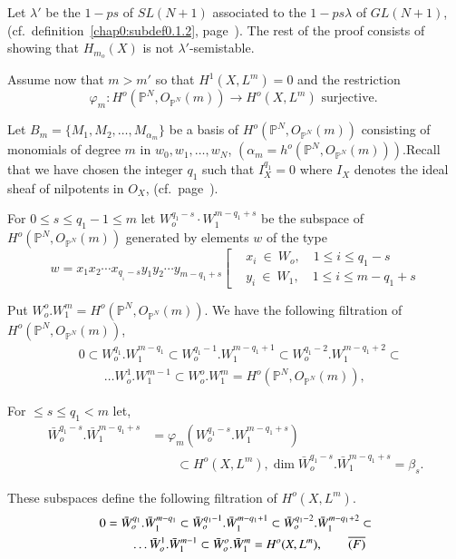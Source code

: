 \noindent
Let $\lambda'$ be the $1-ps$ of $SL(N+1)$ associated to the $1-ps
\lambda$ of $GL(N+1)$, (cf.\ definition~\ref{chap0:subdef0.1.2}, 
page~\pageref{chap0:subdef0.1.2}). The 
rest of the proof consists of showing that $H_{m_o}(X)$ is not
$\lambda'$-semistable. 

Assume now that $m > m'$ so that $H^1 (X, L^m)=0$ and the restriction 
$$
\varphi_m : H^o ( \mathbb{P}^N, O_{\mathbb{P}^N}(m)) \to H^o (X,
L^m) \text{ surjective. } 
$$

\noindent
Let $B_m = \{M_1, M_2, \ldots, M_{\alpha_m}\}$ be a basis of $H^o
(\mathbb{P}^N, O_{\mathbb{P}^N}(m))$ consisting of monomials of
degree $m$ in $w_0, w_1, \ldots , w_N$, $(\alpha_m = h^o (
\mathbb{P}^N, O_{\mathbb{P}^N}(m)))$.\pageoriginale Recall that we have chosen
the integer $q_1$ such that $I^{q_1}_X=0$ where $I_X$ denotes the
ideal sheaf of nilpotents in $O_X$, 
(cf.\ page~\pageref{c1:nilpotents}). 

For $0 \le s \le q_1 - 1 \le m$ let $W_o^{q_1-s} \cdot W_1^{m-q_1+s}$ be
the subspace of $H^o (\mathbb{P}^N, O_{\mathbb{P}^N}(m))$
generated by elements $w$ of the type 
$$
w = x_1 x_2 \cdots x_{q_{_1} -s} y_1 y_2  \cdots y_{m-q_1+s} 
\left[\begin{aligned} & x_i ~\in ~W_o, \quad 1 \le i \le q_1-s\\  
& y_i~ \in~ W_1, \quad 1 \le i \le m-q_1 +s \end{aligned} \right.
$$

Put $W^o_o . W^m_1 = H^o( \mathbb{P}^N, O_{\mathbb{P}^N}(m))$. We
have the following filtration  of $H^o ( \mathbb{P}^N, O_{\mathbb{P}^N}(m))$,  
\begin{align*}
& 0 \subset W_o^{q_1}. W_1^{m-q_1} \subset W_o^{q_1-1}. W^{m-q_1+1}_1
\subset
W^{q_1-2}_o . W^{m-q_1+2}_1 \subset \\
& \qquad \ldots W^1_o . W^{m-1}_1 \subset
W^o_o . W^m_1 = H^o (\mathbb{P}^N, O_{\mathbb{P}^N} (m)), \tag*{(F)}
\end{align*}

\noindent
For $\le s \le q_1 < m $ let,
\begin{align*}
\bar{W}_o^{q_1-s}. \bar{W}_1^{m-q_1+s} &=
\varphi_m (W_o^{q_1-s}. W_1^{m-q_1+s})\\
&\qquad \subset H^o (X,L^m), \dim
\bar{W}^{q_1-s}_o . \bar{W}_1^{m-q_1+s} = \beta_s . 
\end{align*}

\noindent

These subspaces define the following filtration of $H^o(X,L^m)$.
\begin{align*}
0 & = \bar{W}^{q_1}_o. \bar{W}_1^{m-q_1} \subset
\bar{W}_o^{q_1-1} . \bar{W}_1^{m-q_1+1} \subset
\bar{W}_o^{q_1-2} . \bar{W}_1^{m-q_1+2} \subset\\
& \qquad \ldots \bar{W}^1_o . \bar{W}^{m-1}_1 \subset \bar{W}^o_o
. \bar{W}^m_1 = H^o (X,L^m), \tag*{$\overline{(F)}$}
\end{align*}

